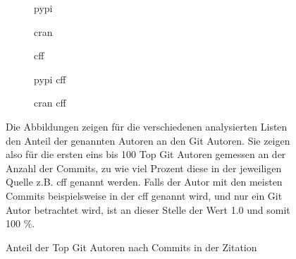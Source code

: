 \begin{figure}
    \begin{subfigure}{.5\textwidth}
        \centering
        
        \caption{\gls{pypi}}
        \label{fig:common_authors_pypi}
    \end{subfigure}%
    \begin{subfigure}{.5\textwidth}
        \centering
        
        \caption{\gls{cran}}
        \label{fig:common_authors_cran}
    \end{subfigure}
    \begin{subfigure}{.5\textwidth}
        \centering
        
        \caption{\gls{cff}}
        \label{fig:common_authors_cff}
    \end{subfigure}%
    \begin{subfigure}{.5\textwidth}
        \centering
        
        \caption{\gls{pypi} \gls{cff}}
        \label{fig:common_authors_pypi_cff}
    \end{subfigure}
    \centering
    \begin{subfigure}{.5\textwidth}
        \centering
        
        \caption{\gls{cran} \gls{cff}}
        \label{fig:common_authors_cran_cff}
    \end{subfigure}
    \caption{Anteil der Top Git Autoren nach Commits in der Zitation}
    \label{fig:common_authors}
    \small
    \raggedright
    Die Abbildungen zeigen für die verschiedenen analysierten Listen den Anteil der genannten Autoren an den Git Autoren. Sie zeigen also für die ersten eins bis 100 Top Git Autoren gemessen an der Anzahl der Commits, zu wie viel Prozent diese in der jeweiligen Quelle z.B. \gls{cff} genannt werden. Falls der Autor mit den meisten Commits beispielsweise in der \gls{cff} genannt wird, und nur ein Git Autor betrachtet wird, ist an dieser Stelle der Wert 1.0 und somit 100 \%.
\end{figure}

